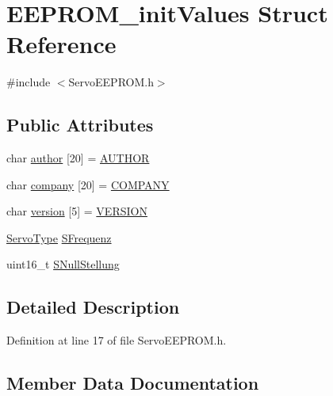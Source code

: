 \hypertarget{struct_e_e_p_r_o_m__init_values}{}\section{E\+E\+P\+R\+O\+M\+\_\+init\+Values Struct Reference}
\label{struct_e_e_p_r_o_m__init_values}


{\ttfamily \#include $<$Servo\+E\+E\+P\+R\+O\+M.\+h$>$}

\subsection*{Public Attributes}
\begin{DoxyCompactItemize}
\item 
char \hyperlink{struct_e_e_p_r_o_m__init_values_ade2f7625e2b736608b3ef57c135f95ba}{author} \mbox{[}20\mbox{]} = \hyperlink{_general_8h_a6c8fad838ed64cc67da3f68149009758}{A\+U\+T\+H\+OR}
\item 
char \hyperlink{struct_e_e_p_r_o_m__init_values_a6da00469d601a55300bf6b3c0ecf0cea}{company} \mbox{[}20\mbox{]} = \hyperlink{_general_8h_a66d6a95c2ba69f100898e9a415dfea64}{C\+O\+M\+P\+A\+NY}
\item 
char \hyperlink{struct_e_e_p_r_o_m__init_values_a1f5a8dd62c0be3b35b9d701a0f079be1}{version} \mbox{[}5\mbox{]} = \hyperlink{_general_8h_a1c6d5de492ac61ad29aec7aa9a436bbf}{V\+E\+R\+S\+I\+ON}
\item 
\hyperlink{_general_8h_ad0662fc04fff667bd896f8d92bebb0f3}{Servo\+Type} \hyperlink{struct_e_e_p_r_o_m__init_values_a4558d08ade80606c9f4e9f0447cbe4b8}{S\+Frequenz}
\item 
uint16\+\_\+t \hyperlink{struct_e_e_p_r_o_m__init_values_a457eae8a2370f49a7463e11bdab92400}{S\+Null\+Stellung}
\end{DoxyCompactItemize}


\subsection{Detailed Description}


Definition at line 17 of file Servo\+E\+E\+P\+R\+O\+M.\+h.



\subsection{Member Data Documentation}
\mbox{\label{struct_e_e_p_r_o_m__init_values_ade2f7625e2b736608b3ef57c135f95ba}} 
